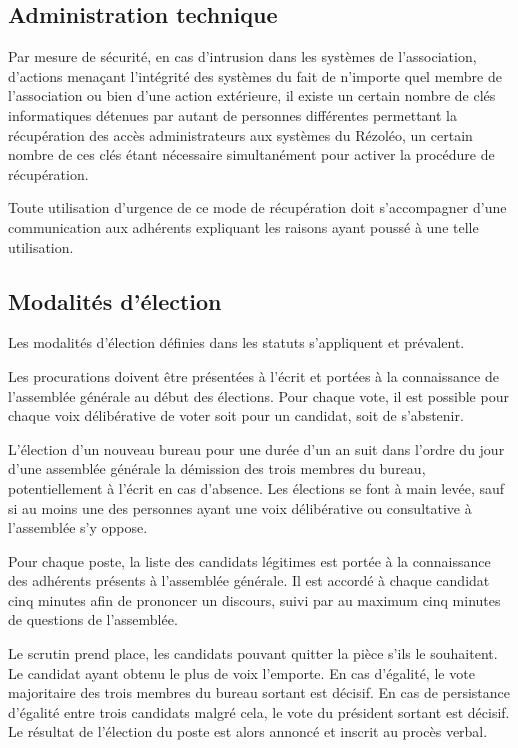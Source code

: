 \documentclass[12pt, a4paper]{article}
\begin{document}
	\subsection{Administration technique}

	Par mesure de sécurité, en cas d'intrusion dans les systèmes de l'association,
	d'actions menaçant l'intégrité des systèmes du fait de n'importe quel membre
	de l'association ou bien d'une action extérieure, il existe un certain nombre de
	clés informatiques détenues par autant de personnes différentes permettant la récupération
	des accès administrateurs aux systèmes du Rézoléo, un certain nombre de ces
	clés étant nécessaire simultanément pour activer la procédure de récupération.

	\bigskip

	Toute utilisation d'urgence de ce mode de récupération doit s'accompagner d'une
	communication aux adhérents expliquant les raisons ayant poussé à une telle utilisation.

	\subsection{Modalités d'élection}

	Les modalités d'élection définies dans les statuts s'appliquent et prévalent.

    \bigskip

	Les procurations doivent être présentées à l'écrit et portées à la
	connaissance de l'assemblée générale au début des élections. Pour chaque vote,
	il est possible pour chaque voix délibérative de voter soit pour un candidat, soit
	de s'abstenir.

	\bigskip

	L'élection d'un nouveau bureau pour une durée d'un an suit dans l'ordre du jour d'une assemblée
	générale la démission des trois membres du bureau, potentiellement à l'écrit en
	cas d'absence. Les élections se font à main levée, sauf si au moins une des personnes
	ayant une voix délibérative ou consultative à l'assemblée s'y oppose.

	\bigskip

	Pour chaque poste, la liste des candidats légitimes est portée à la connaissance
	des adhérents présents à l'assemblée générale. Il est accordé à chaque
	candidat cinq minutes afin de prononcer un discours, suivi par au maximum cinq
	minutes de questions de l'assemblée.

	\bigskip

	Le scrutin prend place, les candidats pouvant quitter la pièce s'ils le souhaitent.
	Le candidat ayant obtenu le plus de voix l'emporte. En cas d'égalité, le vote
	majoritaire des trois membres du bureau sortant est décisif. En cas de persistance
	d'égalité entre trois candidats malgré cela, le vote du président sortant est
	décisif. Le résultat de l'élection du poste est alors annoncé et inscrit au procès
	verbal.
\end{document}
